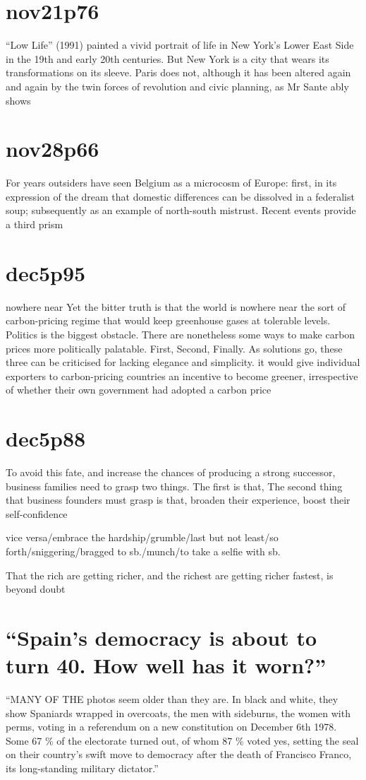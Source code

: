 \documentclass[UTF8]{ctexart}
\begin{document}
\section{nov21p76}
“Low Life” (1991) painted a vivid portrait of life in New York’s Lower East Side in the 19th and early 20th centuries. But New York is a city that wears its transformations on its sleeve. Paris does not, although it has been altered again and again by the twin forces of revolution and civic planning, as Mr Sante ably shows

\section{nov28p66}
For years outsiders have seen Belgium as a microcosm of Europe: first, in its expression of the dream that domestic differences can be dissolved in a federalist soup; subsequently as an example of north-south mistrust. Recent events provide a third prism

\section{dec5p95}
nowhere near
Yet the bitter truth is that the world is nowhere near the sort of carbon-pricing regime that would keep greenhouse gases at tolerable levels. Politics is the biggest obstacle. There are nonetheless some ways to make carbon prices more politically palatable. First,
Second, Finally. As solutions go, these three can be criticised for lacking elegance and simplicity. it would give individual exporters to carbon-pricing countries an incentive to become greener, irrespective of whether their own government had adopted a carbon price

\section{dec5p88}
To avoid this fate, and increase the chances of producing a strong successor, business families need to grasp two things. The first is that, The second thing that business founders must grasp is that, broaden their experience, boost their self-confidence

vice versa/embrace the hardship/grumble/last but not least/so forth/sniggering/bragged to sb./munch/to take a selfie with sb.

That the rich are getting richer, and the richest are getting richer fastest, is beyond doubt 

\section{“Spain’s democracy is about to turn 40. How well has it worn?”}
“MANY OF THE photos seem older than they are. In black and white, they show Spaniards wrapped in overcoats, the men with sideburns, the women with perms, voting in a referendum on a new constitution on December 6th 1978. Some 67 \% of the electorate turned out, of whom 87 \% voted yes, setting the seal on their country’s swift move to democracy after the death of Francisco Franco, its long-standing military dictator.”
\end{document}
